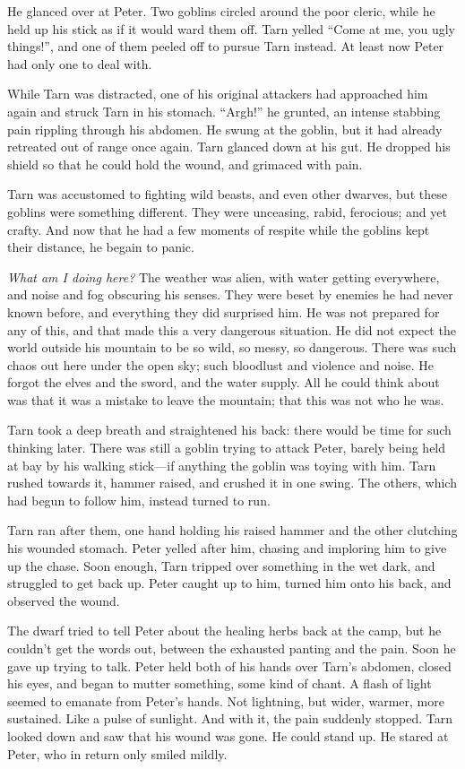 He glanced over at Peter.  Two goblins circled around the poor cleric, while he held up his stick as if it would ward them off.  Tarn yelled ``Come at me, you ugly things!'', and one of them peeled off to pursue Tarn instead.  At least now Peter had only one to deal with.

While Tarn was distracted, one of his original attackers had approached him again and struck Tarn in his stomach.  ``Argh!'' he grunted, an intense stabbing pain rippling through his abdomen.  He swung at the goblin, but it had already retreated out of range once again.  Tarn glanced down at his gut.  He dropped his shield so that he could hold the wound, and grimaced with pain.

Tarn was accustomed to fighting wild beasts, and even other dwarves, but these goblins were something different.  They were unceasing, rabid, ferocious; and yet crafty.  And now that he had a few moments of respite while the goblins kept their distance, he begain to panic.

\emph{What am I doing here?}  The weather was alien, with water getting everywhere, and noise and fog obscuring his senses.  They were beset by enemies he had never known before, and everything they did surprised him.  He was not prepared for any of this, and that made this a very dangerous situation.  He did not expect the world outside his mountain to be so wild, so messy, so dangerous.  There was such chaos out here under the open sky; such bloodlust and violence and noise.  He forgot the elves and the sword, and the water supply.  All he could think about was that it was a mistake to leave the mountain; that this was not who he was.

Tarn took a deep breath and straightened his back: there would be time for such thinking later.  There was still a goblin trying to attack Peter, barely being held at bay by his walking stick---if anything the goblin was toying with him.  Tarn rushed towards it, hammer raised, and crushed it in one swing.  The others, which had begun to follow him, instead turned to run.

Tarn ran after them, one hand holding his raised hammer and the other clutching his wounded stomach.  Peter yelled after him, chasing and imploring him to give up the chase.  Soon enough, Tarn tripped over something in the wet dark, and struggled to get back up.  Peter caught up to him, turned him onto his back, and observed the wound.

The dwarf tried to tell Peter about the healing herbs back at the camp, but he couldn't get the words out, between the exhausted panting and the pain.  Soon he gave up trying to talk.  Peter held both of his hands over Tarn's abdomen, closed his eyes, and began to mutter something, some kind of chant.  A flash of light seemed to emanate from Peter's hands.  Not lightning, but wider, warmer, more sustained.  Like a pulse of sunlight.  And with it, the pain suddenly stopped.  Tarn looked down and saw that his wound was gone.  He could stand up.  He stared at Peter, who in return only smiled mildly.

